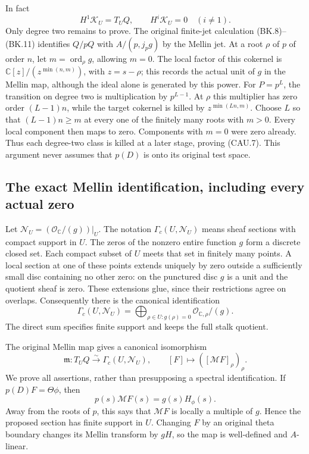 In fact
\[
 H^1\mathscr K_U=T_UQ,
 \qquad H^i\mathscr K_U=0\quad(i\ne1).                        \tag{CAU.7}
\]
Only degree two remains to prove.  The original finite-jet calculation
(BK.8)--(BK.11) identifies
$Q/pQ$ with $A/(p,j_pg)$ by the Mellin jet.  At a root $\rho$ of $p$
of order $n$, let $m=\operatorname{ord}_\rho g$, allowing $m=0$.
The local factor of this cokernel is $\mathbb C[z]/(z^{\min(n,m)})$,
with $z=s-\rho$; this records the actual unit of $g$ in the Mellin map,
although the ideal alone is generated by this power.  For $P=p^L$, the
transition on degree two is multiplication by $p^{L-1}$.  At $\rho$
this multiplier has zero order $(L-1)n$, while the target cokernel is
killed by $z^{\min(Ln,m)}$.  Choose $L$ so that $(L-1)n\ge m$ at
every one of the finitely many roots with $m>0$.  Every local component
then maps to zero.  Components with $m=0$ were zero already.  Thus each
degree-two class is killed at a later stage, proving (CAU.7).
This argument never assumes that $p(D)$ is onto its original test space.

\subsection{The exact Mellin identification, including every actual zero}

Let $\mathcal N_U=(\mathcal O_{\mathbb C}/(g))|_U$.
The notation $\Gamma_c(U,\mathcal N_U)$ means sheaf sections with compact
support in $U$.  The zeros of the nonzero entire function $g$ form a
discrete closed set.  Each compact subset of $U$ meets that set in
finitely many points.  A local section at one of these points extends
uniquely by zero outside a sufficiently small disc containing no other
zero: on the punctured disc $g$ is a unit and the quotient sheaf is zero.
These extensions glue, since their restrictions agree on overlaps.
Consequently there is the canonical identification
\[
 \Gamma_c(U,\mathcal N_U)
   =\bigoplus_{\rho\in U:g(\rho)=0}\mathcal O_{\mathbb C,\rho}/(g).
                                                               \tag{CAU.8}
\]
The direct sum specifies finite support and keeps the full stalk quotient.

The original Mellin map gives a canonical isomorphism
\[
 \mathfrak m:T_UQ\xrightarrow{\sim}\Gamma_c(U,\mathcal N_U),
 \qquad [F]\longmapsto([\mathcal MF]_\rho)_\rho.              \tag{CAU.9}
\]
We prove all assertions, rather than presupposing a spectral
identification.  If $p(D)F=\Theta\phi$, then
\[
 p(s)\mathcal MF(s)=g(s)H_\phi(s).                            \tag{CAU.10}
\]
Away from the roots of $p$, this says that $\mathcal MF$ is locally a
multiple of $g$.  Hence the proposed section has finite support in $U$.
Changing $F$ by an original theta boundary changes its Mellin transform
by $gH$, so the map is well-defined and $A$-linear.

